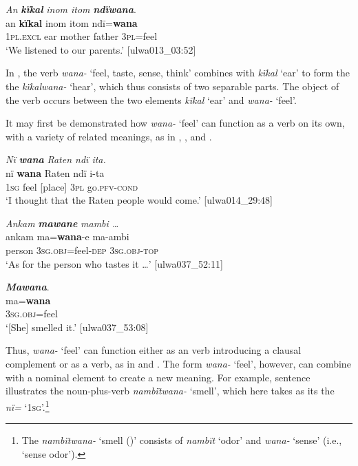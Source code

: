 \ea%
    \label{ex:phrase:55}
          \textit{An} \textbf{\textit{kïkal}} \textit{inom itom} \textbf{\textit{ndïwana}}.\\
\gll an      \textbf{kïkal}  inom    itom  ndï=\textbf{wana}\\
    1\textsc{pl.excl}  ear    mother    father  3\textsc{pl}=feel\\
\glt `We listened to our parents.’ [ulwa013\_03:52]
\z

In , the verb \textit{wana-} ‘feel, taste, sense, think’ combines with \textit{kïkal} ‘ear’ to form the the  \textit{kïkalwana-} ‘hear’, which thus consists of two separable parts. The object of the verb occurs between the two elements \textit{kïkal} ‘ear’ and \textit{wana-} ‘feel’.

It may first be demonstrated how \textit{wana-} ‘feel’ can function as a verb on its own, with a variety of related meanings, as in , , and .

\ea%
    \label{ex:phrase:45}
          \textit{Nï} \textbf{\textit{wana}} \textit{Raten ndï ita.}\\
\gll    nï    \textbf{wana}  Raten  ndï  i-ta\\
    1\textsc{sg}  feel  [place]  \textsc{3pl}  go.\textsc{pfv-cond}\\
\glt `I thought that the Raten people would come.’ [ulwa014\_29:48]
\z

\ea%
    \label{ex:phrase:46}
          \textit{Ankam} \textbf{\textit{mawane}} \textit{mambi …}\\
\gll    ankam  ma=\textbf{wana}{}-e    ma-ambi\\
    person  3\textsc{sg.obj}=feel-\textsc{dep}  3\textsc{sg.obj-top}\\
\glt `As for the person who tastes it …’ [ulwa037\_52:11]
\z

\ea%
    \label{ex:phrase:47}
          \textbf{\textit{Mawana}}.\\
\gll ma=\textbf{wana}\\
    3\textsc{sg.obj}=feel\\
\glt `[She] smelled it.’ [ulwa037\_53:08]
\z

Thus, \textit{wana-} ‘feel’ can function either as an  verb introducing a clausal complement  or as a  verb, as in  and . The form \textit{wana-} ‘feel’, however, can combine with a nominal element to create a new meaning. For example, sentence  illustrates the noun-plus-verb  \textit{nambïtwana-} ‘smell’, which here takes as its  the  \textit{nï=} ‘1\textsc{sg}’.\footnote{The  \textit{nambïtwana-} ‘smell ()’ consists of \textit{nambït} ‘odor’ and \textit{wana-} ‘sense’ (i.e., ‘sense odor’).}

